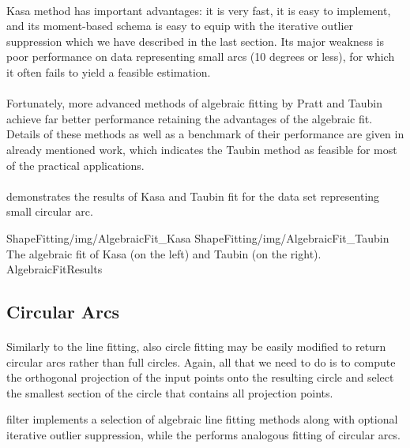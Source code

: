 \paragraph*{}
Kasa method has important advantages: it is very fast, it is easy to implement, and its moment-based schema is easy to equip with the iterative outlier suppression which we have described in the last section. Its major weakness is poor performance on data representing small arcs (10 degrees or less), for which it often fails to yield a feasible estimation.

\paragraph*{}
Fortunately, more advanced methods of algebraic fitting by Pratt and Taubin achieve far better performance retaining the advantages of the algebraic fit. Details of these methods as well as a benchmark of their performance are given in already mentioned work\cite{Chernov10}, which indicates the Taubin method as feasible for most of the practical applications.  

\paragraph*{}
 demonstrates the results of Kasa and Taubin fit for the data set representing small circular arc.

\twoFigures
{ShapeFitting/img/AlgebraicFit_Kasa}
{ShapeFitting/img/AlgebraicFit_Taubin}
{The algebraic fit of Kasa (on the left) and Taubin (on the right).}
{AlgebraicFitResults}
{\basicWidth}

\subsection{Circular Arcs}

\paragraph*{}
Similarly to the line fitting, also circle fitting may be easily modified to return circular arcs rather than full circles. Again, all that we need to do is to compute the orthogonal projection of the input points onto the resulting circle and select the smallest section of the circle that contains all projection points.

\begin{refImpl}
\studio filter  implements a selection of algebraic line fitting methods along with optional iterative outlier suppression, while the  performs analogous fitting of circular arcs.
\end{refImpl}